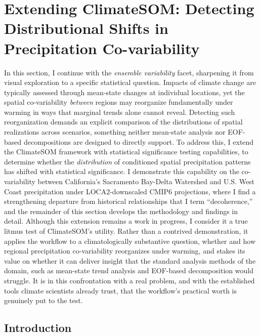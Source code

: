 \section{Extending ClimateSOM: Detecting Distributional Shifts in Precipitation Co-variability}\label{sec:agu}

In this section, I continue with the \emph{ensemble variability} facet, sharpening it from visual exploration to a specific statistical question.
%
Impacts of climate change are typically assessed through mean-state changes at individual locations, yet the spatial co-variability \emph{between} regions may reorganize fundamentally under warming in ways that marginal trends alone cannot reveal.
%
Detecting such reorganization demands an explicit comparison of the distributions of spatial realizations across scenarios, something neither mean-state analysis nor EOF-based decompositions are designed to directly support.
%
To address this, I extend the ClimateSOM framework with statistical significance testing capabilities, to determine whether the \emph{distribution} of conditioned spatial precipitation patterns has shifted with statistical significance.
%
%
I demonstrate this capability on the co-variability between California's Sacramento Bay-Delta Watershed and U.S. West Coast precipitation under LOCA2-downscaled CMIP6 projections, where I find a strengthening departure from historical relationships that I term ``decoherence,'' and the remainder of this section develops the methodology and findings in detail.
%
Although this extension remains a work in progress, I consider it a true litmus test of ClimateSOM's utility. 
%
Rather than a contrived demonstration, it applies the workflow to a climatologically substantive question, whether and how regional precipitation co-variability reorganizes under warming, and stakes its value on whether it can deliver insight that the standard analysis methods of the domain, such as mean-state trend analysis and EOF-based decomposition would struggle. 
%
It is in this confrontation with a real problem, and with the established tools climate scientists already trust, that the workflow's practical worth is genuinely put to the test.

\subsection{Introduction}
\label{sec:introduction}

